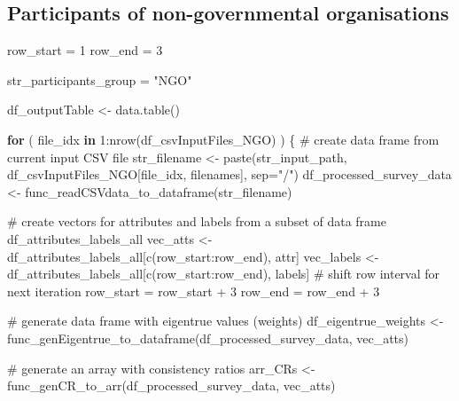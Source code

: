 \documentclass[
]{article}
\newenvironment{Shaded}{\begin{snugshade}}{\end{snugshade}}
\newcommand{\AttributeTok}[1]{\textcolor[rgb]{0.00,0.34,0.68}{#1}}
\newcommand{\CommentTok}[1]{\textcolor[rgb]{0.54,0.53,0.53}{#1}}
\newcommand{\ControlFlowTok}[1]{\textcolor[rgb]{0.12,0.11,0.11}{\textbf{#1}}}
\newcommand{\DecValTok}[1]{\textcolor[rgb]{0.69,0.50,0.00}{#1}}
\newcommand{\FunctionTok}[1]{\textcolor[rgb]{0.39,0.29,0.61}{#1}}
\newcommand{\NormalTok}[1]{\textcolor[rgb]{0.12,0.11,0.11}{#1}}
\newcommand{\OtherTok}[1]{\textcolor[rgb]{0.00,0.43,0.16}{#1}}
\newcommand{\SpecialCharTok}[1]{\textcolor[rgb]{0.24,0.68,0.91}{#1}}
\newcommand{\StringTok}[1]{\textcolor[rgb]{0.75,0.01,0.01}{#1}}
\begin{document}
\hypertarget{participants-of-non-governmental-organisations}{%
\subsection{Participants of non-governmental
organisations}\label{participants-of-non-governmental-organisations}}

\begin{Shaded}
\begin{Highlighting}[]
\NormalTok{row\_start }\OtherTok{=} \DecValTok{1}
\NormalTok{row\_end }\OtherTok{=} \DecValTok{3}

\NormalTok{str\_participants\_group }\OtherTok{=} \StringTok{"NGO"}

\NormalTok{df\_outputTable }\OtherTok{\textless{}{-}} \FunctionTok{data.table}\NormalTok{()}

\ControlFlowTok{for}\NormalTok{ ( file\_idx }\ControlFlowTok{in} \DecValTok{1}\SpecialCharTok{:}\FunctionTok{nrow}\NormalTok{(df\_csvInputFiles\_NGO) ) \{}
  \CommentTok{\# create data frame from current input CSV file}
\NormalTok{  str\_filename }\OtherTok{\textless{}{-}} \FunctionTok{paste}\NormalTok{(str\_input\_path, df\_csvInputFiles\_NGO[file\_idx, filenames], }\AttributeTok{sep=}\StringTok{"/"}\NormalTok{)}
\NormalTok{  df\_processed\_survey\_data }\OtherTok{\textless{}{-}} \FunctionTok{func\_readCSVdata\_to\_dataframe}\NormalTok{(str\_filename)}
  
  \CommentTok{\# create vectors for attributes and labels from a subset of data frame \textquotesingle{}df\_attributes\_labels\_all\textquotesingle{}}
\NormalTok{  vec\_atts }\OtherTok{\textless{}{-}}\NormalTok{ df\_attributes\_labels\_all[}\FunctionTok{c}\NormalTok{(row\_start}\SpecialCharTok{:}\NormalTok{row\_end), attr]}
\NormalTok{  vec\_labels }\OtherTok{\textless{}{-}}\NormalTok{ df\_attributes\_labels\_all[}\FunctionTok{c}\NormalTok{(row\_start}\SpecialCharTok{:}\NormalTok{row\_end), labels]}
  \CommentTok{\# shift row interval for next iteration}
\NormalTok{  row\_start }\OtherTok{=}\NormalTok{ row\_start }\SpecialCharTok{+} \DecValTok{3}
\NormalTok{  row\_end }\OtherTok{=}\NormalTok{ row\_end }\SpecialCharTok{+} \DecValTok{3}
  
  \CommentTok{\# generate data frame with eigentrue values (weights) }
\NormalTok{  df\_eigentrue\_weights }\OtherTok{\textless{}{-}} \FunctionTok{func\_genEigentrue\_to\_dataframe}\NormalTok{(df\_processed\_survey\_data, vec\_atts)}
  
  \CommentTok{\# generate an array with consistency ratios}
\NormalTok{  arr\_CRs }\OtherTok{\textless{}{-}} \FunctionTok{func\_genCR\_to\_arr}\NormalTok{(df\_processed\_survey\_data, vec\_atts)}


\end{Highlighting}
\end{Shaded}
\end{document}

